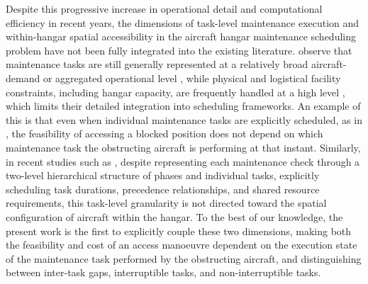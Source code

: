 Despite this progressive increase in operational detail and computational efficiency in recent years, the dimensions of task-level maintenance execution and within-hangar spatial accessibility in the aircraft hangar maintenance scheduling problem have not been fully integrated into the existing literature. \citet{Guo2026} observe that maintenance tasks are still generally represented at a relatively broad aircraft-demand or aggregated operational level \citep{DENG2021113545,WITTEMAN2021365}, while physical and logistical facility constraints, including hangar capacity, are frequently handled at a high level \citep{chen2017assigning}, which limits their detailed integration into scheduling frameworks. An example of this is that even when individual maintenance tasks are explicitly scheduled, as in \citet{Qin2020}, the feasibility of accessing a blocked position does not depend on which maintenance task the obstructing aircraft is performing at that instant. Similarly, in recent studies such as \citet{Pileggi2026}, despite representing each maintenance check through a two-level hierarchical structure of phases and individual tasks, explicitly scheduling task durations, precedence relationships, and shared resource requirements, this task-level granularity is not directed toward the spatial configuration of aircraft within the hangar. To the best of our knowledge, the present work is the first to explicitly couple these two dimensions, making both the feasibility and cost of an access manoeuvre dependent on the execution state of the maintenance task performed by the obstructing aircraft, and distinguishing between inter-task gaps, interruptible tasks, and non-interruptible tasks.